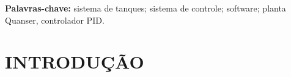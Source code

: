 \documentclass[a4paper,12pt]{article}
\begin{document}
\vspace{1.5cm}

\textbf{Palavras-chave:} sistema de tanques; sistema de controle; software; planta Quanser, controlador PID.

\newpage


\thispagestyle{empty}

\begin{center}
\listoffigures
\end{center}

\newpage


\thispagestyle{empty}

\begin{center}
\tableofcontents
\end{center}

\newpage


\thispagestyle{main}

\section{INTRODUÇÃO}
\end{document}
